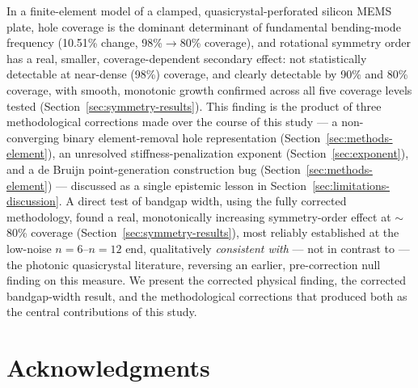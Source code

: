 \documentclass[11pt]{article}
\begin{document}
In a finite-element model of a clamped, quasicrystal-perforated silicon MEMS plate, hole coverage is the dominant determinant of fundamental bending-mode frequency (10.51\% change, 98\%$\to$80\% coverage), and rotational symmetry order has a real, smaller, coverage-dependent secondary effect: not statistically detectable at near-dense (98\%) coverage, and clearly detectable by 90\% and 80\% coverage, with smooth, monotonic growth confirmed across all five coverage levels tested (Section~\ref{sec:symmetry-results}). This finding is the product of three methodological corrections made over the course of this study --- a non-converging binary element-removal hole representation (Section~\ref{sec:methods-element}), an unresolved stiffness-penalization exponent (Section~\ref{sec:exponent}), and a de Bruijn point-generation construction bug (Section~\ref{sec:methods-element}) --- discussed as a single epistemic lesson in Section~\ref{sec:limitations-discussion}. A direct test of bandgap width, using the fully corrected methodology, found a real, monotonically increasing symmetry-order effect at $\sim$80\% coverage (Section~\ref{sec:symmetry-results}), most reliably established at the low-noise $n=6$--$n=12$ end, qualitatively \textit{consistent with} --- not in contrast to --- the photonic quasicrystal literature, reversing an earlier, pre-correction null finding on this measure. We present the corrected physical finding, the corrected bandgap-width result, and the methodological corrections that produced both as the central contributions of this study.

\section*{Acknowledgments}
\end{document}

